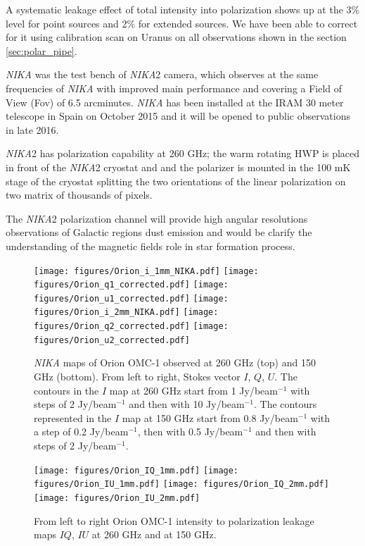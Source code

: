 \documentclass[twocolumn,traditabstract]{aa}
\begin{document}
 A systematic leakage effect of total intensity into polarization shows up at the 3\% level for point sources and 2\% for extended sources. 
 We have been able to correct for it using calibration scan on Uranus on all observations shown in the section \ref{sec:polar_pipe}.
 
 {\it NIKA} was the test bench of {\it NIKA}2 camera, which observes at the same frequencies of {\it NIKA} with improved main performance and covering a Field of View (Fov) of 6.5 arcminutes. {\it NIKA} has been installed at the IRAM 30 meter telescope in Spain on October 2015 and it will be opened to public observations in late 2016. 
 
 {\it NIKA}2 has polarization capability at 260 GHz; the warm rotating HWP is placed in front of the {\it NIKA}2 cryostat and and the polarizer is mounted in the 100 mK stage of the cryostat splitting the two orientations of the linear polarization on two matrix of thousands of pixels.
 
The {\it NIKA}2 polarization channel will provide high angular resolutions observations of Galactic regions dust emission and would be clarify the understanding of the magnetic fields role in star formation process. 


\begin{figure}
  \begin{center}
    \texttt{[image: figures/Orion\_i\_1mm\_NIKA.pdf]}
    \texttt{[image: figures/Orion\_q1\_corrected.pdf]}
   \texttt{[image: figures/Orion\_u1\_corrected.pdf]}
     \texttt{[image: figures/Orion\_i\_2mm\_NIKA.pdf]}
    \texttt{[image: figures/Orion\_q2\_corrected.pdf]}
   \texttt{[image: figures/Orion\_u2\_corrected.pdf]}
\caption{ {\it NIKA} maps of Orion OMC-1 observed at 260 GHz (top) and 150 GHz (bottom). From left to right, Stokes vector $I$, $Q$, $U$. The contours in the $I$ map at 260 GHz start from 1 Jy/beam$^{-1}$ with steps of 2 Jy/beam$^{-1}$  and then with 10 Jy/beam$^{-1}$. The contours represented in the $I$ map at 150 GHz start from 0.8 Jy/beam$^{-1}$ with a step of 0.2 Jy/beam$^{-1}$, then with 0.5 Jy/beam$^{-1}$ and then with steps of 2 Jy/beam$^{-1}$.}
  \label{Orion}
  \end{center}
  \end{figure}

 \begin{figure}
  \begin{center}
   \texttt{[image: figures/Orion\_IQ\_1mm.pdf]}
    \texttt{[image: figures/Orion\_IU\_1mm.pdf]}
  \texttt{[image: figures/Orion\_IQ\_2mm.pdf]}
    \texttt{[image: figures/Orion\_IU\_2mm.pdf]}
  \caption{ From left to right Orion OMC-1 intensity to polarization leakage maps $IQ$, $IU$ at 260 GHz and at 150 GHz.}
  \label{Orion_leakage}
  \end{center}
  \end{figure}
  
\end{document}
